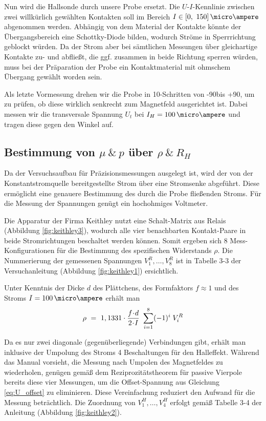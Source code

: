 Nun wird die Hallsonde durch unsere Probe ersetzt. Die $U$-$I$-Kennlinie zwischen zwei willkürlich gewählten Kontakten soll im Bereich $I \in [0,~150]\,\micro\ampere$ abgenommen werden. Abhängig von dem Material der Kontakte könnte der Übergangsbereich eine Schottky-Diode bilden, wodurch Ströme in Sperrrichtung geblockt würden. Da der Strom aber bei sämtlichen Messungen über gleichartige Kontakte zu- und abfließt, die ggf. zusammen in beide Richtung sperren würden, muss bei der Präparation der Probe ein Kontaktmaterial mit ohmschem Übergang gewählt worden sein.

Als letzte Vormessung drehen wir die Probe in 10\degree-Schritten von -90\degree bis +90\degree, um zu prüfen, ob diese wirklich senkrecht zum Magnetfeld ausgerichtet ist. Dabei messen wir die transversale Spannung $U_t$ bei $I_H = 100\,\micro\ampere$ und tragen diese gegen den Winkel auf.


\newpage
\subsection{Bestimmung von $\mu ~\&~ p$ über $\rho ~\&~ R_H$}
\enlargethispage{4em}

Da der Versuchsaufbau für Präzisionsmessungen ausgelegt ist, wird der von der Konstantstromquelle bereitgestellte Strom über eine Stromsenke abgeführt. Diese ermöglicht eine genauere Bestimmung des durch die Probe fließenden Stroms. Für die Messung der Spannungen genügt ein hochohmiges Voltmeter.

Die Apparatur der Firma Keithley nutzt eine Schalt-Matrix aus Relais (Abbildung \ref{fig:keithley3}), wodurch alle vier benachbarten Kontakt-Paare in beide Stromrichtungen beschaltet werden können. Somit ergeben sich 8 Mess-Konfigurationen für die Bestimmung des spezifischen Widerstands $\rho$.
Die Nummerierung der gemessenen Spannungen $V^R_1, \dots, V^R_8$ ist in Tabelle 3-3 der Versuchanleitung (Abbildung \ref{fig:keithley1}) ersichtlich.

Unter Kenntnis der Dicke $d$ des Plättchens, des Formfaktors $f \approx 1$ und des Stroms  $I = 100\,\micro\ampere$ erhält man\\[-1.2em]
\begin{equation}
\rho ~=~ 1,1331 \cdot \frac{f \!\cdot\! d}{2 \!\cdot\! I} ~ \sum\limits_{i=1}^8 (-1)^i \; V^R_i
\end{equation}

Da es nur zwei \glqq diagonale\grqq{} (gegenüberliegende) Verbindungen gibt, erhält man inklusive der Umpolung des Stroms 4 Beschaltungen für den Halleffekt. Während das Manual \cite{lit:manual} vorsieht, die Messung nach Umpolen des Magnetfeldes zu wiederholen, genügen  gemäß dem Reziprozitätstheorem für passive Vierpole bereits diese vier Messungen, um die Offset-Spannung aus Gleichung \eqref{eq:U_offset} zu eliminieren. Diese Vereinfachung reduziert den Aufwand für die Messung beträchtlich. Die Zuordnung von $V^H_1, \dots, V^H_4$ erfolgt gemäß Tabelle 3-4 der Anleitung (Abbildung \ref{fig:keithley2}).

